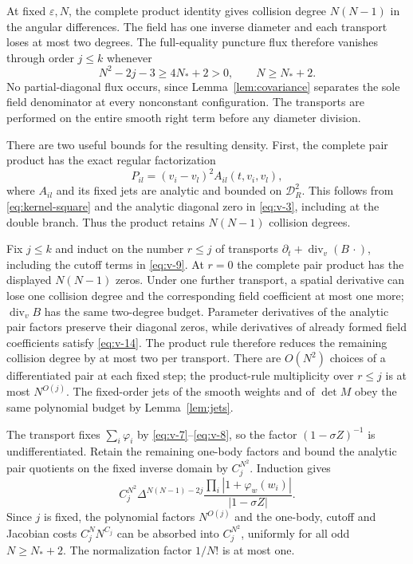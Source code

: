 \documentclass[11pt]{article}
\numberwithin{equation}{section}
\theoremstyle{remark}\newtheorem{remark}[theorem]{Remark}
\begin{document}
At fixed $\varepsilon,N$, the complete product identity gives
collision degree $N(N-1)$ in the angular differences.
The field has one inverse diameter and each transport loses at most
two degrees. The full-equality puncture flux therefore vanishes
through order $j\le k$ whenever
\begin{equation}\label{eq:v-18}
 N^2-2j-3\ge4N_*+2>0,\qquad N\ge N_*+2.
\end{equation}
No partial-diagonal flux occurs, since Lemma~\ref{lem:covariance}
separates the sole field denominator at every nonconstant configuration. The transports are performed on the
entire smooth right term before any diameter division.

There are two useful bounds for the resulting density. First,
the complete pair product has the exact regular factorization
\[
 P_{il}=(v_i-v_l)^2A_{il}(t,v_i,v_l),
\]
where $A_{il}$ and its fixed jets are analytic and bounded on
$\mathcal D_R^2$. This follows from \eqref{eq:kernel-square}
and the analytic diagonal zero in \eqref{eq:v-3}, including at
the double branch. Thus the product retains $N(N-1)$ collision
degrees.

Fix $j\le k$ and induct on the number $r\le j$ of transports
$\partial_t+\operatorname{div}_v(B\,\cdot)$, including the
cutoff terms in \eqref{eq:v-9}. At $r=0$ the complete pair product
has the displayed $N(N-1)$ zeros. Under one further transport,
a spatial derivative can lose one collision degree and the
corresponding field coefficient at most one more;
$\operatorname{div}_v B$ has the same two-degree budget.
Parameter derivatives of the analytic pair factors preserve their
diagonal zeros, while derivatives of already formed field
coefficients satisfy \eqref{eq:v-14}. The product rule therefore
reduces the remaining collision degree by at most two per
transport. There are $O(N^2)$ choices of a differentiated pair
at each fixed step; the product-rule multiplicity over $r\le j$
is at most $N^{O(j)}$. The fixed-order jets of the smooth weights
and of $\det M$ obey the same polynomial budget by
Lemma~\ref{lem:jets}.

The transport fixes $\sum_i\varphi_i$ by
\eqref{eq:v-7}--\eqref{eq:v-8}, so the factor
$(1-\sigma Z)^{-1}$ is undifferentiated. Retain the remaining one-body
factors and bound the analytic pair quotients on the fixed inverse
domain by $C_j^{N^2}$. Induction gives
\begin{equation}\label{eq:full-product-density}
 C_j^{N^2}\Delta^{N(N-1)-2j}
       \frac{\prod_i|1+\varphi_w(w_i)|}{|1-\sigma Z|}.
\end{equation}
Since $j$ is fixed, the polynomial factors
$N^{O(j)}$ and the one-body, cutoff and Jacobian costs
$C_j^N N^{C_j}$ can be absorbed into $C_j^{N^2}$,
uniformly for all odd $N\ge N_*+2$.
The normalization factor $1/N!$ is at most one.
\end{document}
